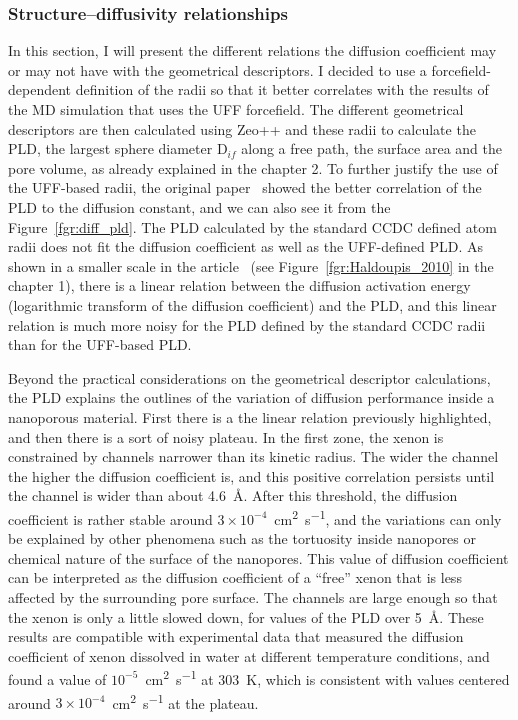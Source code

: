\documentclass[main]{subfiles}
\begin{document}
\subsubsection{Structure--diffusivity relationships}\label{sct:xenon_diff_screen}

In this section, I will present the different relations the diffusion coefficient may or may not have with the geometrical descriptors. I decided to use a forcefield-dependent definition of the radii so that it better correlates with the results of the MD simulation that uses the UFF forcefield. The different geometrical descriptors are then calculated using Zeo++ and these radii to calculate the PLD, the largest sphere diameter D$_{if}$ along a free path, the surface area and the pore volume, as already explained in the chapter 2. To further justify the use of the UFF-based radii, the original paper~\cite{Hung_2021} showed the better correlation of the PLD to the diffusion constant, and we can also see it from the Figure~\ref{fgr:diff_pld}. The PLD calculated by the standard CCDC defined atom radii does not fit the diffusion coefficient as well as the UFF-defined PLD. As shown in a smaller scale in the article~\cite{Haldoupis_2010} (see Figure~\ref{fgr:Haldoupis_2010} in the chapter 1), there is a linear relation between the diffusion activation energy (logarithmic transform of the diffusion coefficient) and the PLD, and this linear relation is much more noisy for the PLD defined by the standard CCDC radii than for the UFF-based PLD.

Beyond the practical considerations on the geometrical descriptor calculations, the PLD explains the outlines of the variation of diffusion performance inside a nanoporous material. First there is a the linear relation previously highlighted, and then there is a sort of noisy plateau. In the first zone, the xenon is constrained by channels narrower than its kinetic radius. The wider the channel the higher the diffusion coefficient is, and this positive correlation persists until the channel is wider than about \SI{4.6}{\angstrom}. After this threshold, the diffusion coefficient is rather stable around $3\times 10^{-4}$~\si{\square\cm\per\s}, and the variations can only be explained by other phenomena such as the tortuosity inside nanopores or chemical nature of the surface of the nanopores. This value of diffusion coefficient can be interpreted as the diffusion coefficient of a ``free'' xenon that is less affected by the surrounding pore surface. The channels are large enough so that the xenon is only a little slowed down, for values of the PLD over \SI{5}{\angstrom}. These results are compatible with experimental data that measured the diffusion coefficient of xenon dissolved in water at different temperature conditions, and found a value of $10^{-5}$~\si{\square\cm\per\s} at \SI{303}{\kelvin},\autocite{Wise1968} which is consistent with values centered around $3\times 10^{-4}$~\si{\square\cm\per\s} at the plateau.
\end{document}
